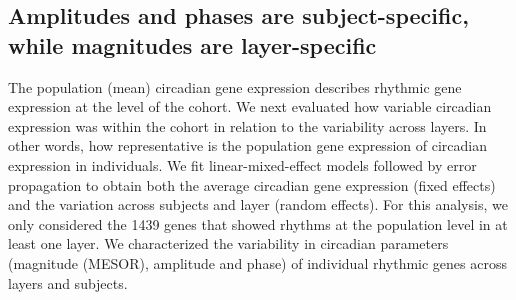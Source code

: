 

\subsection*{Amplitudes and phases are subject-specific, while magnitudes are layer-specific}
The population (mean) circadian gene expression describes rhythmic gene expression at the level of the cohort. We next evaluated how variable circadian expression was within the cohort in relation to the variability across layers. In other words, how representative is the population gene expression of circadian expression in individuals. We fit linear-mixed-effect models \cite{Hoffman2016} followed by error propagation to obtain both the average circadian gene expression (fixed effects) and the variation across subjects and layer (random effects). For this analysis, we only considered the 1439 genes that showed rhythms at the population level in at least one layer. We characterized the variability in circadian parameters (magnitude (MESOR), amplitude and phase) of individual rhythmic genes across layers and subjects.

